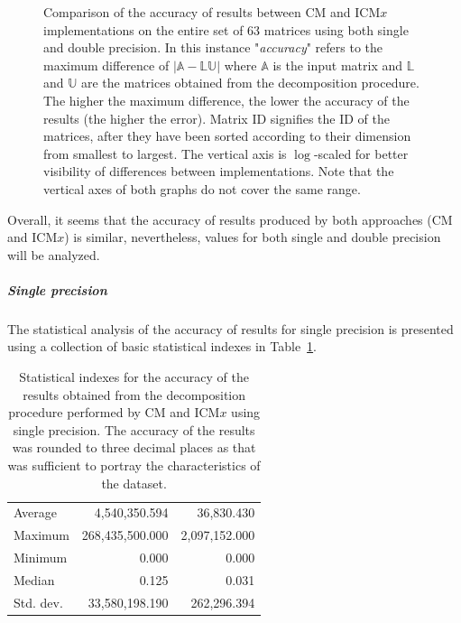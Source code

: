 \begin{figure}[ht!]
\begin{subfigure}{\textwidth}
	\end{subfigure}
	\caption{Comparison of the accuracy of results between CM and ICM$ x $ implementations on the entire set of 63 matrices using both single and double precision. In this instance "\textit{accuracy}" refers to the maximum difference of $ \left| \mathbb{A} - \mathbb{L}\mathbb{U} \right| $ where $ \mathbb{A} $ is the input matrix and $ \mathbb{L} $ and $ \mathbb{U} $ are the matrices obtained from the decomposition procedure. The higher the maximum difference, the lower the accuracy of the results (the higher the error). Matrix ID signifies the ID of the matrices, after they have been sorted according to their dimension from smallest to largest. The vertical axis is $ \log $-scaled for better visibility of differences between implementations. Note that the vertical axes of both graphs do not cover the same range.}
	\label{Graph:comparing-decomposition-implementations-performance-of-implementations-across-all-matrices-accuracy-single-double-precision}
\end{figure}

Overall, it seems that the accuracy of results produced by both approaches (CM and ICM$ x $) is similar, nevertheless, values for both single and double precision will be analyzed.
\subparagraph{Single precision} The statistical analysis of the accuracy of results for single precision is presented using a collection of basic statistical indexes in Table~\ref{Table:comparing-decomposition-implementations-performance-of-implementations-across-all-matrices-accuracy-statistical-indexes-single-precision}.

\begin{table}[ht!]
	\centering
	\renewcommand{\arraystretch}{1.5}
	\begin{tabular}{|>{\footnotesize}l|>{\raggedleft\arraybackslash\footnotesize}r|>{\raggedleft\arraybackslash\footnotesize}r|}
		\hline
		\multicolumn{1}{|>{\centering\footnotesize}c|}{Accuracy index} & \multicolumn{1}{>{\centering\footnotesize}c|}{CM} & \multicolumn{1}{>{\centering\footnotesize}c|}{ICM$ x $} \\
		\hline
		Average   &   4,540,350.594 &    36,830.430 \\
		Maximum   & 268,435,500.000 & 2,097,152.000 \\
		Minimum   &           0.000 &         0.000 \\
		Median    &           0.125 &         0.031 \\
		Std. dev. &  33,580,198.190 &   262,296.394 \\
		\hline
	\end{tabular}
	\caption{Statistical indexes for the accuracy of the results obtained from the decomposition procedure performed by CM and ICM$ x $ using single precision. The accuracy of the results was rounded to three decimal places as that was sufficient to portray the characteristics of the dataset.}
	\label{Table:comparing-decomposition-implementations-performance-of-implementations-across-all-matrices-accuracy-statistical-indexes-single-precision}
\end{table}

